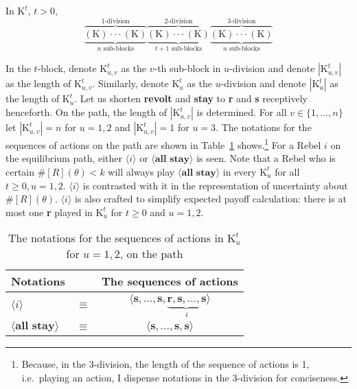 \documentclass[12pt,letter]{article}
\newcommand{\Kappa}{\mathrm{K}}
\theoremstyle{definition}
\theoremstyle{remark}
\theoremstyle{claim}
\begin{document}
In $\Kappa^t$, $t>0$,
\[\overbrace{\underbrace{(\Kappa) \cdot \cdot \cdot (\Kappa)}_{\text{$n$ sub-blocks}}}^{\text{$1$-division}} \overbrace{\underbrace{(\Kappa) \cdot \cdot \cdot (\Kappa)}_{\text{$t+1$ sub-blocks}} }^{\text{$2$-division}} \overbrace{\underbrace{(\Kappa) \cdot \cdot \cdot (\Kappa)}_{\text{$n$ sub-blocks}}}^{\text{$3$-division}}\] 




In the $t$-block, denote $\Kappa^t_{u,v}$ as the $v$-th sub-block in $u$-division and denote $|\Kappa^t_{u,v} |$ as the length of $\Kappa^t_{u,v}$. Similarly, denote $\Kappa^t_{u}$ as the $u$-division and denote $|\Kappa^t_{u} |$ as the length of $\Kappa^t_{u}$. Let us shorten \textbf{revolt} and \textbf{stay} to \textbf{r} and \textbf{s} receptively henceforth. On the path, the length of $|\Kappa^t_{u,v}|$ is determined. For all $v\in \{1,...,n\}$ let $|\Kappa^t_{u,v}|=n$ for $u=1,2$ and $|\Kappa^t_{u,v}|=1$ for $u=3$. The notations for the sequences of actions on the path are shown in Table~\ref{Table_msg_coordination} shows.\footnote{Because, in the $3$-division, the length of the sequence of actions is 1, i.e.~playing an action, I dispense notations in the $3$-division for conciseness.}
For a Rebel $i$ on the equilibrium path, either $\langle i \rangle$ or $\langle \textbf{all stay} \rangle$ is seen. Note that a Rebel who is certain $\#[R](\theta)<k$ will always play $\langle \textbf{all stay} \rangle$ in every $\Kappa^t_{u}$ for all $t\geq 0,u=1,2$. $\langle i \rangle$ is contrasted with it in the representation of uncertainty about $\#[R](\theta)$. $\langle i \rangle$ is also crafted to simplify expected payoff calculation: there is at most one \textbf{r} played in $\Kappa^t_u$ for $t\geq 0$ and $u=1,2$.    

\begin{table}[!htbp]
\caption{The notations for the sequences of actions in $\Kappa^t_{u}$ for $u=1,2$, on the path}
\label{Table_msg_coordination}
\begin{center}
\begin{tabular}{l c c}
Notations & &The sequences of actions \\
\hline
\hline
$\langle i \rangle$ 				& $\equiv$ 			& $\langle \textbf{s},...,\textbf{s},\underbrace{\textbf{r},\textbf{s},...,\textbf{s}}_{i} \rangle$  \\
$\langle \textbf{all stay} \rangle$	 					& $\equiv$ 			& $\langle \textbf{s},...,\textbf{s},{\textbf{s}}\rangle$  \\
\hline
\end{tabular}
\end{center}
\end{table}
\end{document}
